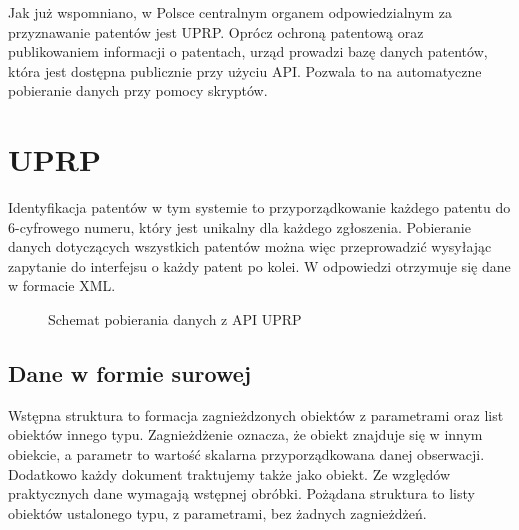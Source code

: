Jak już wspomniano, w Polsce centralnym organem odpowiedzialnym
za przyznawanie patentów jest \acf{UPRP}. Oprócz ochroną patentową
oraz publikowaniem informacji o patentach, urząd prowadzi
bazę danych patentów, która jest dostępna publicznie przy użyciu \ac{API}.
Pozwala to na automatyczne pobieranie danych przy pomocy skryptów.

\section{\ac{UPRP}}\label{sec:UPRP}

Identyfikacja patentów w tym systemie to przyporządkowanie
każdego patentu do 6-cyfrowego numeru, który jest unikalny dla
każdego zgłoszenia. Pobieranie danych dotyczących wszystkich patentów 
można więc przeprowadzić wysyłając zapytanie do interfejsu o każdy
patent po kolei. W odpowiedzi otrzymuje się dane w formacie \ac{XML}.

\bigskip
\begin{figure}[H]
\centering
{}
\caption{Schemat pobierania danych z \ac{API} \ac{UPRP}}
\end{figure}

\subsection{Dane w formie surowej}
\label{sec:profilowanie-UPRP}

Wstępna struktura to formacja zagnieżdzonych obiektów z parametrami 
oraz list obiektów innego typu. Zagnieżdżenie oznacza, że obiekt znajduje się
w innym obiekcie, a parametr to wartość skalarna przyporządkowana danej obserwacji.
Dodatkowo każdy dokument traktujemy także jako obiekt.
Ze względów praktycznych dane wymagają wstępnej obróbki.
Pożądana struktura to listy obiektów ustalonego typu, z parametrami, 
bez żadnych zagnieżdżeń.

